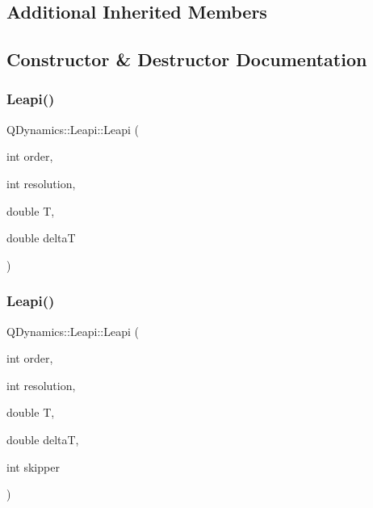 \subsection*{Additional Inherited Members}


\subsection{Constructor \& Destructor Documentation}
\mbox{\label{classQDynamics_1_1Leapi_aa6feac37d39339e26f89626f7bdbc8f0}} 
\subsubsection{\texorpdfstring{Leapi()}{Leapi()}\hspace{0.1cm}{\footnotesize\ttfamily [1/2]}}
{\footnotesize\ttfamily Q\+Dynamics\+::\+Leapi\+::\+Leapi (\begin{DoxyParamCaption}\item[{int}]{order,  }\item[{int}]{resolution,  }\item[{double}]{T,  }\item[{double}]{deltaT }\end{DoxyParamCaption})\hspace{0.3cm}{\ttfamily [inline]}}

\mbox{\label{classQDynamics_1_1Leapi_a008a9a757055debd2e1da2b5ac64a746}} 
\subsubsection{\texorpdfstring{Leapi()}{Leapi()}\hspace{0.1cm}{\footnotesize\ttfamily [2/2]}}
{\footnotesize\ttfamily Q\+Dynamics\+::\+Leapi\+::\+Leapi (\begin{DoxyParamCaption}\item[{int}]{order,  }\item[{int}]{resolution,  }\item[{double}]{T,  }\item[{double}]{deltaT,  }\item[{int}]{skipper }\end{DoxyParamCaption})\hspace{0.3cm}{\ttfamily [inline]}}



